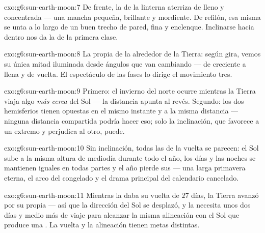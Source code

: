 \begin{solution}{exo:g6:sun-earth-moon:7}
De frente, la  de la linterna aterriza de lleno y concentrada
--- una mancha pequeña, brillante y mordiente. De refilón, esa misma
 se unta a lo largo de un buen trecho de pared, fina y
enclenque. Inclinarse hacia dentro nos da la de la primera clase.
\end{solution}

\begin{solution}{exo:g6:sun-earth-moon:8}
La propia  de la  alrededor de la Tierra: según
gira, vemos su única mitad iluminada desde ángulos que van cambiando
--- de creciente a llena y de vuelta. El espectáculo de las fases lo
dirige el movimiento tres.
\end{solution}

\begin{solution}{exo:g6:sun-earth-moon:9}
Primero: el invierno del norte ocurre mientras la Tierra viaja algo
\emph{más cerca} del Sol --- la distancia apunta al revés. Segundo:
los dos hemisferios tienen  opuestas en el mismo instante
y a la misma distancia --- ninguna distancia compartida podría hacer
eso; solo la inclinación, que favorece a un extremo y perjudica al
otro, puede.
\end{solution}

\begin{solution}{exo:g6:sun-earth-moon:10}
Sin inclinación, todas las  de la vuelta se parecen: el Sol
sube a la misma altura de mediodía durante todo el año, los días y las
noches se mantienen iguales en todas partes y el año pierde sus
 --- una larga primavera eterna, el arco del
 congelado y el drama principal del calendario
cancelado.
\end{solution}

\begin{solution}{exo:g6:sun-earth-moon:11}
Mientras la  daba su vuelta de $27$ días, la Tierra avanzó por
su propia  --- así que la dirección del Sol se desplazó, y la
 necesita unos dos días y medio más de viaje para alcanzar la
misma alineación con el Sol que produce una . La vuelta y
la alineación tienen metas distintas.
\end{solution}


